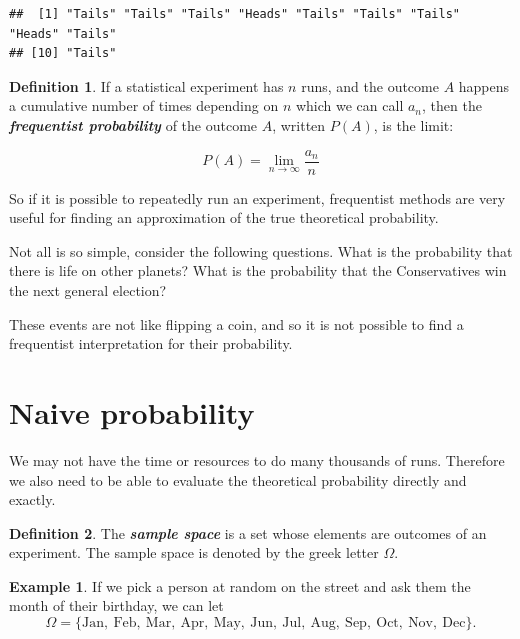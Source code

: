 \documentclass[
]{book}
\theoremstyle{definition}
\newtheorem{definition}{Definition}[chapter]
\theoremstyle{definition}
\newtheorem{example}{Example}[chapter]
\theoremstyle{definition}
\theoremstyle{definition}
\theoremstyle{remark}
\begin{document}
\begin{verbatim}
##  [1] "Tails" "Tails" "Tails" "Heads" "Tails" "Tails" "Tails" "Heads" "Tails"
## [10] "Tails"
\end{verbatim}

\begin{definition}
\protect\hypertarget{def:freq}{}\label{def:freq}If a statistical experiment has \(n\) runs, and the outcome \(A\) happens a cumulative number of times depending on \(n\) which we can call \(a_n\), then the \textbf{\emph{frequentist probability}} of the outcome \(A\), written \(P(A)\), is the limit:

\[P(A) = \lim_{n\to \infty} \frac{a_n}{n}\]
\end{definition}

So if it is possible to repeatedly run an experiment, frequentist methods are very useful for finding an approximation of the true theoretical probability.

Not all is so simple, consider the following questions. What is the probability that there is life on other planets? What is the probability that the Conservatives win the next general election?

These events are not like flipping a coin, and so it is not possible to find a frequentist interpretation for their probability.

\hypertarget{naive-probability}{%
\section{Naive probability}\label{naive-probability}}

We may not have the time or resources to do many thousands of runs. Therefore we also need to be able to evaluate the theoretical probability directly and exactly.

\begin{definition}
\protect\hypertarget{def:samplespace}{}\label{def:samplespace}The \textbf{\emph{sample space}} is a set whose elements are outcomes of an experiment. The sample space is denoted by the greek letter \(\Omega\).
\end{definition}

\begin{example}
\protect\hypertarget{exm:monthspace}{}\label{exm:monthspace}If we pick a person at random on the street and ask them the month of their birthday,
we can let
\[\Omega = \{\text{Jan}, \ \text{Feb}, \ \text{Mar},  \ \text{Apr}, \ \text{May}, \ \text{Jun}, \ \text{Jul}, \ \text{Aug}, \ \text{Sep}, \ \text{Oct}, \ \text{Nov}, \ \text{Dec} \}.\]
\end{example}
\end{document}
